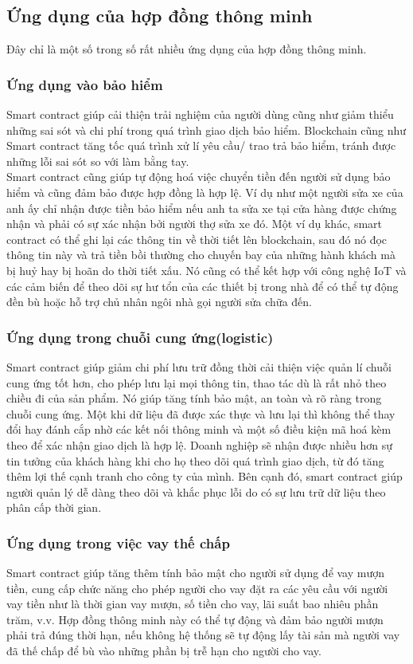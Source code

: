 \documentclass[a4paper]{article}
\begin{document}
\subsection{Ứng dụng của hợp đồng thông minh}
Đây chỉ là một số trong số rất nhiều ứng dụng của hợp đồng thông minh.
\subsubsection{Ứng dụng vào bảo hiểm}
Smart contract giúp cải thiện trải nghiệm của người dùng cũng như giảm thiểu những sai sót và chi phí trong quá trình giao dịch bảo hiểm. Blockchain cũng như Smart contract tăng tốc quá trình xử lí yêu cầu/ trao trả bảo hiểm, tránh được những lỗi sai sót so với làm bằng tay.\\
Smart contract cũng giúp tự động hoá việc chuyển tiền đến người sử dụng bảo hiểm và cũng đảm bảo được hợp đồng là hợp lệ. Ví dụ như một người sửa xe của anh ấy chỉ nhận được tiền bảo hiểm nếu anh ta sửa xe tại cửa hàng được chứng nhận và phải có sự xác nhận bởi người thợ sửa xe đó. Một ví dụ khác, smart contract có thể ghi lại các thông tin về thời tiết lên blockchain, sau đó nó đọc thông tin này và trả tiền bồi thường cho chuyến bay của những hành khách mà bị huỷ hay bị hoãn do thời tiết xấu. Nó cũng có thể kết hợp với công nghệ IoT và các cảm biến để theo dõi sự hư tổn của các thiết bị trong nhà để có thể tự động đền bù hoặc hỗ trợ chủ nhân ngôi nhà gọi người sửa chữa đến.

\subsubsection{Ứng dụng trong chuỗi cung ứng(logistic)}

Smart contract giúp giảm chi phí lưu trữ đồng thời cải thiện việc quản lí chuỗi cung ứng tốt hơn, cho phép lưu lại mọi thông tin, thao tác dù là rất nhỏ theo chiều đi của sản phẩm. Nó giúp tăng tính bảo mật, an toàn và rõ ràng trong chuỗi cung ứng. Một khi dữ liệu đã được xác thực và lưu lại thì không thể thay đổi hay đánh cắp nhờ các kết nối thông minh và một số điều kiện mã hoá kèm theo để xác nhận giao dịch là hợp lệ. Doanh nghiệp sẽ nhận được nhiều hơn sự tin tưởng của khách hàng khi cho họ theo dõi quá trình giao dịch, từ đó tăng thêm lợi thế cạnh tranh cho công ty của mình. Bên cạnh đó, smart contract giúp người quản lý dễ dàng theo dõi và khắc phục lỗi do có sự lưu trữ dữ liệu theo phân cấp thời gian.

\subsubsection{Ứng dụng trong việc vay thế chấp}
Smart contract giúp tăng thêm tính bảo mật cho người sử dụng để vay mượn tiền, cung cấp chức năng cho phép người cho vay đặt ra các yêu cầu với người vay tiền như là thời gian vay mượn, số tiền cho vay, lãi suất bao nhiêu phần trăm, v.v. Hợp đồng thông minh này có thể tự động và đảm bảo người mượn phải trả đúng thời hạn, nếu không hệ thống sẽ tự động lấy tài sản mà người vay đã thế chấp để bù vào những phần bị trễ hạn cho người cho vay.
\end{document}

